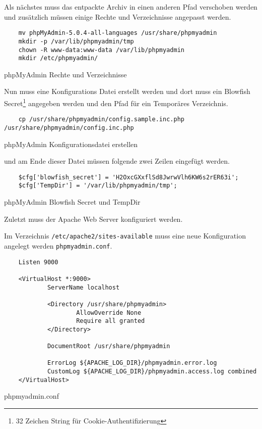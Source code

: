 Als nächstes muss das entpackte Archiv in einen anderen Pfad verschoben werden
und zusätzlich müssen einige Rechte und Verzeichnisse angepasst werden.

\begin{listing}[H]
  \begin{verbatim}
    mv phpMyAdmin-5.0.4-all-languages /usr/share/phpmyadmin
    mkdir -p /var/lib/phpmyadmin/tmp
    chown -R www-data:www-data /var/lib/phpmyadmin
    mkdir /etc/phpmyadmin/
  \end{verbatim}
  \caption{phpMyAdmin Rechte und Verzeichnisse}
\end{listing}

Nun muss eine Konfigurations Datei erstellt werden und dort muss ein Blowfish
Secret\footnote{32 Zeichen String für Cookie-Authentifizierung} angegeben werden und den Pfad für ein Temporäres Verzeichnis.

\begin{listing}[H]
  \begin{verbatim}
    cp /usr/share/phpmyadmin/config.sample.inc.php /usr/share/phpmyadmin/config.inc.php
  \end{verbatim}
  \caption{phpMyAdmin Konfigurationsdatei erstellen}
\end{listing}

und am Ende dieser Datei müssen folgende zwei Zeilen eingefügt werden.

\begin{listing}[H]
  \begin{verbatim}
    $cfg['blowfish_secret'] = 'H2OxcGXxflSd8JwrwVlh6KW6s2rER63i'; 
    $cfg['TempDir'] = '/var/lib/phpmyadmin/tmp';
  \end{verbatim}
  \caption{phpMyAdmin Blowfish Secret und TempDir}
\end{listing}


Zuletzt muss der Apache Web Server konfiguriert werden.

Im Verzeichnis \verb|/etc/apache2/sites-available| muss eine neue
Konfiguration angelegt werden \verb|phpmyadmin.conf|.

\begin{listing}[H]
  \begin{verbatim}
    Listen 9000

    <VirtualHost *:9000>
            ServerName localhost
    
            <Directory /usr/share/phpmyadmin>
                    AllowOverride None
                    Require all granted
            </Directory>
    
            DocumentRoot /usr/share/phpmyadmin
    
            ErrorLog ${APACHE_LOG_DIR}/phpmyadmin.error.log
            CustomLog ${APACHE_LOG_DIR}/phpmyadmin.access.log combined
    </VirtualHost>
  \end{verbatim}
  \caption{phpmyadmin.conf}
\end{listing}

